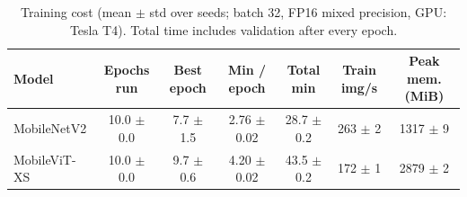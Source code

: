\begin{table}[!t]
\centering
\footnotesize
\caption{Training cost (mean $\pm$ std over seeds; batch 32, FP16 mixed precision, GPU: Tesla T4). Total time includes validation after every epoch.}
\label{tab:traincost}
\begin{tabular}{lcccccc}
\toprule
Model & Epochs run & Best epoch & Min / epoch & Total min & Train img/s & Peak mem. (MiB) \\
\midrule
MobileNetV2 & 10.0 $\pm$ 0.0 & 7.7 $\pm$ 1.5 & 2.76 $\pm$ 0.02 & 28.7 $\pm$ 0.2 & 263 $\pm$ 2 & 1317 $\pm$ 9 \\
MobileViT-XS & 10.0 $\pm$ 0.0 & 9.7 $\pm$ 0.6 & 4.20 $\pm$ 0.02 & 43.5 $\pm$ 0.2 & 172 $\pm$ 1 & 2879 $\pm$ 2 \\
\bottomrule
\end{tabular}
\end{table}
